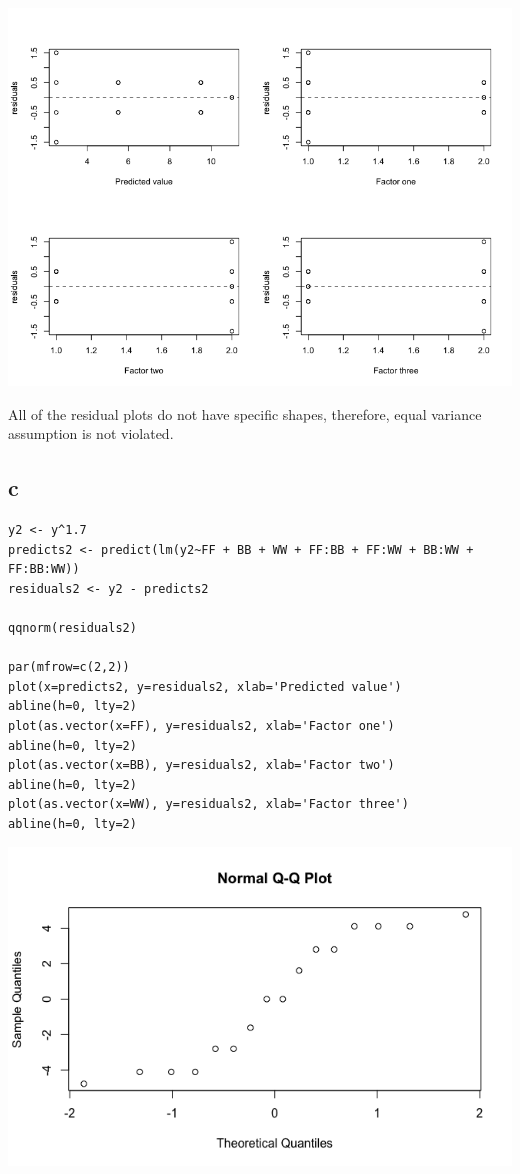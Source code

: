 \documentclass[11pt,letterpaper]{article}
\begin{document}
\includegraphics[scale=0.55]{lect-14-3-b-residualplot.png}

\noindent All of the residual plots do not have specific shapes, therefore, equal variance assumption is not violated. 


\subsection*{c}
\begin{verbatim}
y2 <- y^1.7
predicts2 <- predict(lm(y2~FF + BB + WW + FF:BB + FF:WW + BB:WW + FF:BB:WW))
residuals2 <- y2 - predicts2

qqnorm(residuals2)

par(mfrow=c(2,2))
plot(x=predicts2, y=residuals2, xlab='Predicted value')
abline(h=0, lty=2)
plot(as.vector(x=FF), y=residuals2, xlab='Factor one')
abline(h=0, lty=2)
plot(as.vector(x=BB), y=residuals2, xlab='Factor two')
abline(h=0, lty=2)
plot(as.vector(x=WW), y=residuals2, xlab='Factor three')
abline(h=0, lty=2)
\end{verbatim}

\includegraphics[scale=0.55]{lect-14-3-c-qqplot.png}
\end{document}
